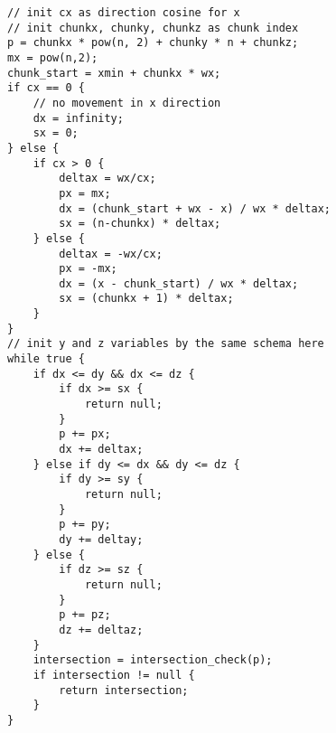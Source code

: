 \begin{lstlisting}[basicstyle=\small, caption={[Original CW88 algorithm]The original CW88 algorithm, slightly adapted to support arbitrary chunk sizes}, label={lst:cw88}]
// init cx as direction cosine for x
// init chunkx, chunky, chunkz as chunk index
p = chunkx * pow(n, 2) + chunky * n + chunkz;
mx = pow(n,2);
chunk_start = xmin + chunkx * wx;
if cx == 0 {
    // no movement in x direction
    dx = infinity;
    sx = 0;
} else {
    if cx > 0 {
        deltax = wx/cx;
        px = mx;
        dx = (chunk_start + wx - x) / wx * deltax;
        sx = (n-chunkx) * deltax;
    } else {
        deltax = -wx/cx;
        px = -mx;
        dx = (x - chunk_start) / wx * deltax;
        sx = (chunkx + 1) * deltax;
    }
}
// init y and z variables by the same schema here
while true {
    if dx <= dy && dx <= dz {
        if dx >= sx {
            return null;
        }
        p += px;
        dx += deltax;
    } else if dy <= dx && dy <= dz {
        if dy >= sy {
            return null;
        }
        p += py;
        dy += deltay;
    } else {
        if dz >= sz {
            return null;
        }
        p += pz;
        dz += deltaz;
    }
    intersection = intersection_check(p);
    if intersection != null {
        return intersection;
    }
}
\end{lstlisting}

